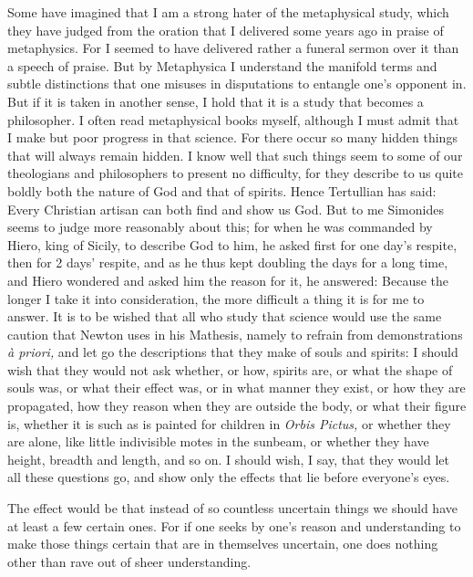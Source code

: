 \documentclass[12pt,a4paper,openany]{book}
\newcommand{\opage}[1]{\marginnote{\footnotesize\textit{[#1]}}}
\begin{document}
Some have imagined that I am a strong hater of the metaphysical study, which
they have judged from the oration that I delivered some years ago in praise of
metaphysics.
\setcounter{footnote}{0}%
\opage{5}For I seemed to have delivered rather a funeral sermon over it than a
speech of praise. But by Metaphysica I understand the manifold terms and subtle
distinctions that one misuses in disputations to entangle one's opponent in.
But if it is taken in another sense, I hold that it is a study that becomes a
philosopher. I often read metaphysical books myself, although I must admit that
I make but poor progress in that science. For there occur so many hidden things
that will always remain hidden. I know well that such things seem to some of our
theologians and philosophers to present no difficulty, for they describe to us
quite boldly both the nature of God and that of spirits. Hence Tertullian
has said: Every Christian artisan can both find and show us God. But to me
Simonides seems to judge more reasonably about this; for when he was commanded
by Hiero, king of Sicily, to describe God to him, he asked first for one day's
respite, then for 2 days' respite, and as he thus kept doubling the days for a
long time, and Hiero wondered and asked him the reason for it, he answered:
Because the longer I take it into consideration, the more difficult a thing it
is for me to answer. It is to be wished that all who study that science would
use the same caution that Newton uses in his Mathesis, namely to refrain from
demonstrations \textit{à priori,} and let go the descriptions that they make of
souls and spirits: I should wish that they would not ask whether, or how,
spirits are, or what the shape of souls was, or what their effect was, or in
what manner they exist, or how they are propagated, how they reason when they
are outside the body, or what their figure is, whether it is such as is painted
for children in \textit{Orbis Pictus,} or whether they are alone, like little
indivisible motes in the sunbeam, or whether they have height, breadth and
length, and so on. I should wish, I say, that they would let all these
questions go, and show only the effects that lie before everyone's eyes.

\setcounter{footnote}{0}%
\opage{6}The effect would be that instead of so countless uncertain things we
should have at least a few certain ones. For if one seeks by one's reason and
understanding to make those things certain that are in themselves uncertain,
one does nothing other than rave out of sheer understanding.
\end{document}
